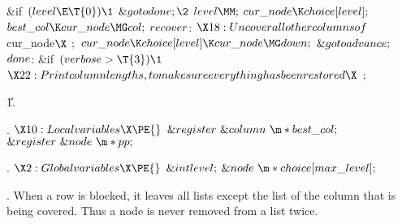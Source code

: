 \&{if}~$(\\{level}\E\T{0})\1$\5
$\&{goto}~\\{done};\2$\6
$\\{level}\MM;$\5
$\\{cur\_node}\K\\{choice}[\\{level}];$\5
$\\{best\_col}\K\\{cur\_node}\MG\\{col};$\6\4
$\\{recover}$:\5
$\X18:Uncover all other columns of $\\{cur\_node}$\X$\6
$;$\5
$\\{cur\_node}\K\\{choice}[\\{level}]\K\\{cur\_node}\MG\\{down};$\5
$\&{goto}~\\{advance};$\6\4
$\\{done}$:\6
\&{if}~$(\\{verbose}>\T{3})\1$\5
$\X22:Print column lengths, to make sure everything has been restored\X$\2\6
$;$\par
\U 1.\fi

. \Y\B\4$\X10:Local variables\X\PE{}$\6
$\&{register}~\&{column}~\m*\\{best\_col};$\6
$\&{register}~\&{node}~\m*\\{pp};$\par
\fi

. \Y\B\4$\X2:Global variables\X\PE{}$\6
$\&{int}~\\{level};$\6
$\&{node}~\m*\\{choice}[\\{max\_level}];$\par
\fi

. When a row is blocked, it leaves all lists except the list of the
column that is being covered. Thus a node is never removed from a list
twice.

